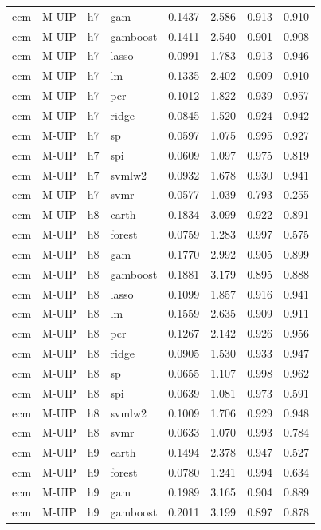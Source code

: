 \begin{ThreePartTable}
\begin{longtable}[t]{llclcccc}
ecm & M-UIP & h7 & gam & 0.1437 & 2.586 & 0.913 & 0.910\\
ecm & M-UIP & h7 & gamboost & 0.1411 & 2.540 & 0.901 & 0.908\\
ecm & M-UIP & h7 & lasso & 0.0991 & 1.783 & 0.913 & 0.946\\
ecm & M-UIP & h7 & lm & 0.1335 & 2.402 & 0.909 & 0.910\\
ecm & M-UIP & h7 & pcr & 0.1012 & 1.822 & 0.939 & 0.957\\
ecm & M-UIP & h7 & ridge & 0.0845 & 1.520 & 0.924 & 0.942\\
ecm & M-UIP & h7 & sp & 0.0597 & 1.075 & 0.995 & 0.927\\
ecm & M-UIP & h7 & spi & 0.0609 & 1.097 & 0.975 & 0.819\\
ecm & M-UIP & h7 & svmlw2 & 0.0932 & 1.678 & 0.930 & 0.941\\
ecm & M-UIP & h7 & svmr & 0.0577 & 1.039 & 0.793 & 0.255\\
\addlinespace
ecm & M-UIP & h8 & earth & 0.1834 & 3.099 & 0.922 & 0.891\\
ecm & M-UIP & h8 & forest & 0.0759 & 1.283 & 0.997 & 0.575\\
ecm & M-UIP & h8 & gam & 0.1770 & 2.992 & 0.905 & 0.899\\
ecm & M-UIP & h8 & gamboost & 0.1881 & 3.179 & 0.895 & 0.888\\
ecm & M-UIP & h8 & lasso & 0.1099 & 1.857 & 0.916 & 0.941\\
ecm & M-UIP & h8 & lm & 0.1559 & 2.635 & 0.909 & 0.911\\
ecm & M-UIP & h8 & pcr & 0.1267 & 2.142 & 0.926 & 0.956\\
ecm & M-UIP & h8 & ridge & 0.0905 & 1.530 & 0.933 & 0.947\\
ecm & M-UIP & h8 & sp & 0.0655 & 1.107 & 0.998 & 0.962\\
ecm & M-UIP & h8 & spi & 0.0639 & 1.081 & 0.973 & 0.591\\
ecm & M-UIP & h8 & svmlw2 & 0.1009 & 1.706 & 0.929 & 0.948\\
ecm & M-UIP & h8 & svmr & 0.0633 & 1.070 & 0.993 & 0.784\\
\addlinespace
ecm & M-UIP & h9 & earth & 0.1494 & 2.378 & 0.947 & 0.527\\
ecm & M-UIP & h9 & forest & 0.0780 & 1.241 & 0.994 & 0.634\\
ecm & M-UIP & h9 & gam & 0.1989 & 3.165 & 0.904 & 0.889\\
ecm & M-UIP & h9 & gamboost & 0.2011 & 3.199 & 0.897 & 0.878\\

\end{longtable}
\end{ThreePartTable}
